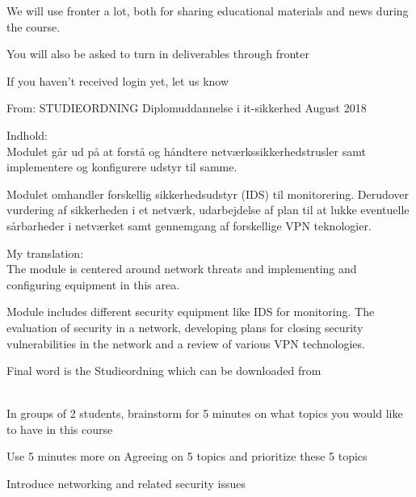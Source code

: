 \documentclass[Screen16to9,17pt]{foils}
\begin{document}


We will use fronter a lot, both for sharing educational materials and news during the course.

You will also be asked to turn in deliverables through fronter


\vskip 5mm
\centerline{If you haven't received login yet, let us know}


From: STUDIEORDNING Diplomuddannelse i it-sikkerhed August 2018

Indhold:\\
Modulet går ud på at forstå og håndtere netværkssikkerhedstrusler samt implementere og
konfigurere udstyr til samme.

Modulet omhandler forskellig sikkerhedsudstyr (IDS) til monitorering. Derudover vurdering af sikkerheden i et netværk, udarbejdelse af plan til at lukke eventuelle sårbarheder i netværket samt gennemgang af forskellige VPN teknologier.

My translation:\\
The module is centered around network threats and implementing and configuring equipment in this area.

Module includes different security equipment like IDS for monitoring.
The evaluation of security in a network, developing plans for closing security vulnerabilities in the network and a review of various VPN technologies.

Final word is the Studieordning which can be downloaded from\\
{\footnotesize {}\\
}




In groups of 2 students, brainstorm for 5 minutes on what topics you would like to have in this course

Use 5 minutes more on Agreeing on 5 topics and prioritize these 5 topics



\begin{list1}
\item Introduce networking and related security issues
\end{list1}
\end{document}
